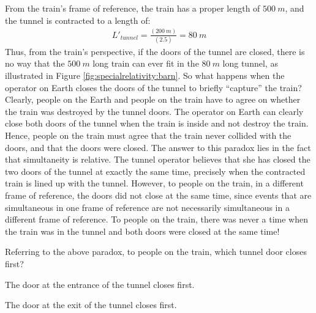 From the train's frame of reference, the train has a proper length of $\SI{500}{m}$, and the tunnel is contracted to a length of:
\begin{align*}
L'_{tunnel}=\frac{(\SI{200}{m})}{(2.5)}=\SI{80}{m}
\end{align*}
Thus, from the train's perspective, if the doors of the tunnel are closed, there is no way that the $\SI{500}{m}$ long train can ever fit in the $\SI{80}{m}$ long tunnel, as illustrated in Figure \ref{fig:specialrelativity:barn}. So what happens when the operator on Earth closes the doors of the tunnel to briefly ``capture'' the train? 
Clearly, people on the Earth and people on the train have to agree on whether the train was destroyed by the tunnel doors. The operator on Earth can clearly close both doors of the tunnel when the train is inside and not destroy the train. Hence, people on the train must agree that the train never collided with the doors, and that the doors were closed. The answer to this paradox lies in the fact that simultaneity is relative. The tunnel operator believes that she has closed the two doors of the tunnel at exactly the same time, precisely when the contracted train is lined up with the tunnel. However, to people on the train, in a different frame of reference, the doors did not close at the same time, since events that are simultaneous in one frame of reference are not necessarily simultaneous in a different frame of reference. To people on the train, there was never a time when the train was in the tunnel and both doors were closed at the same time!
\begin{checkpoint}{}
	\begin{MCquestion}{Referring to the above paradox, to people on the train, which tunnel door closes first?}
		\item The door at the entrance of the tunnel closes first. 
		\item The door at the exit of the tunnel closes first. \correct
	\end{MCquestion}
\end{checkpoint}

